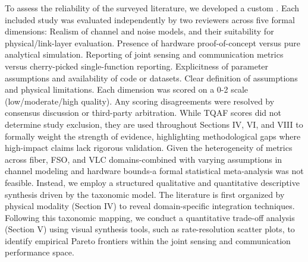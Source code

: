 {}To assess the reliability of the surveyed literature, we developed a custom . Each included study was evaluated independently by two reviewers across five formal dimensions:\markdownRendererInterblockSeparator
{}\markdownRendererOlBeginTight
{} Realism of channel and noise models, and their suitability for physical/link-layer evaluation.\markdownRendererOlItemEnd 
{} Presence of hardware proof-of-concept versus pure analytical simulation.\markdownRendererOlItemEnd 
{} Reporting of joint sensing and communication metrics versus cherry-picked single-function reporting.\markdownRendererOlItemEnd 
{} Explicitness of parameter assumptions and availability of code or datasets.\markdownRendererOlItemEnd 
{} Clear definition of assumptions and physical limitations.\markdownRendererOlItemEnd 
\markdownRendererOlEndTight \markdownRendererInterblockSeparator
{}Each dimension was scored on a 0-2 scale (low/moderate/high quality). Any scoring disagreements were resolved by consensus discussion or third-party arbitration. While TQAF scores did not determine study exclusion, they are used throughout Sections IV, VI, and VIII to formally weight the strength of evidence, highlighting methodological gaps where high-impact claims lack rigorous validation.\markdownRendererInterblockSeparator
{}
\markdownRendererSectionEnd \markdownRendererSectionBegin
{}\markdownRendererInterblockSeparator
{}Given the heterogeneity of metrics across fiber, FSO, and VLC domains-combined with varying assumptions in channel modeling and hardware bounds-a formal statistical meta-analysis was not feasible. Instead, we employ a structured qualitative and quantitative descriptive synthesis driven by the taxonomic model. The literature is first organized by physical modality (Section IV) to reveal domain-specific integration techniques. Following this taxonomic mapping, we conduct a quantitative trade-off analysis (Section V) using visual synthesis tools, such as rate-resolution scatter plots, to identify empirical Pareto frontiers within the joint sensing and communication performance space.\markdownRendererInterblockSeparator
